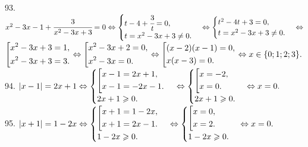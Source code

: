 \documentclass[12pt]{article}
\begin{document}
93. $x^2-3x-1+\cfrac{3}{x^2-3x+3}=0\Leftrightarrow \begin{cases}t-4+\cfrac{3}{t}=0,\\ t=x^2-3x+3\neq0.\end{cases}\Leftrightarrow
\begin{cases}t^2-4t+3=0,\\ t=x^2-3x+3\neq0.\end{cases}\Leftrightarrow$\\$\left[\begin{gathered}
     x^2-3x+3=1,\hfill\\
     x^2-3x+3=3.\hfill \end{gathered}\right.\Leftrightarrow\left[\begin{gathered}
     x^2-3x+2=0,\hfill\\
     x^2-3x=0.\hfill \end{gathered}\right.\Leftrightarrow\left[\begin{gathered}
     (x-2)(x-1)=0,\hfill\\
     x(x-3)=0.\hfill \end{gathered}\right.\Leftrightarrow x\in\{0;1;2;3\}.$\\
94. $|x-1|=2x+1\Leftrightarrow\begin{cases}\left[
      \begin{gathered} x-1=2x+1,\hfill\\
      x-1=-2x-1.\hfill \end{gathered}\right.\\
2x+1\geqslant0.\end{cases}\Leftrightarrow\begin{cases}\left[
      \begin{gathered} x=-2,\hfill\\
      x=0.\hfill \end{gathered}\right.\\
2x+1\geqslant0.\end{cases}\Leftrightarrow x=0.$\\
95. $|x+1|=1-2x\Leftrightarrow\begin{cases}\left[
      \begin{gathered} x+1=1-2x,\hfill\\
      x+1=2x-1.\hfill \end{gathered}\right.\\
1-2x\geqslant0.\end{cases}\Leftrightarrow\begin{cases}\left[
      \begin{gathered} x=0,\hfill\\
      x=2.\hfill \end{gathered}\right.\\
1-2x\geqslant0.\end{cases}\Leftrightarrow x=0.$\\
\end{document}
